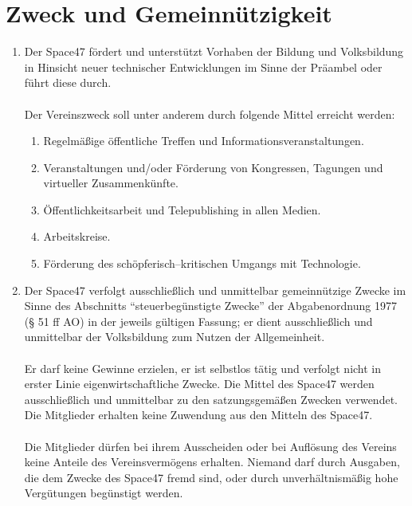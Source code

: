 \documentclass[a4paper]{article}
\begin{document}
\section{Zweck und Gemeinnützigkeit}
\begin{enumerate}
	\item Der Space47 fördert und unterstützt Vorhaben der Bildung und Volksbildung in Hinsicht neuer technischer Entwicklungen im Sinne der Präambel oder führt diese durch. \\ \\
	Der Vereinszweck soll unter anderem durch folgende Mittel erreicht werden:
	\begin{enumerate}[-]
		\item Regelmäßige öffentliche Treffen und Informationsveranstaltungen.
		\item Veranstaltungen und/oder Förderung von Kongressen, Tagungen und virtueller Zusammenkünfte.
		\item Öffentlichkeitsarbeit und Telepublishing in allen Medien.
		\item Arbeitskreise.
		\item Förderung des schöpferisch–kritischen Umgangs mit Technologie.
	\end{enumerate}

	\item Der Space47 verfolgt ausschließlich und unmittelbar gemeinnützige Zwecke im Sinne des Abschnitts \enquote{steuerbegünstigte Zwecke} der Abgabenordnung 1977 (§ 51 ff AO) in der jeweils gültigen Fassung; er dient ausschließlich und unmittelbar der Volksbildung zum Nutzen der Allgemeinheit. \\ \\
	Er darf keine Gewinne erzielen, er ist selbstlos tätig und verfolgt nicht in erster Linie eigenwirtschaftliche Zwecke. Die Mittel des Space47 werden ausschließlich und unmittelbar zu den satzungsgemäßen Zwecken verwendet. Die Mitglieder erhalten keine Zuwendung aus den Mitteln des Space47. \\ \\
	Die Mitglieder dürfen bei ihrem Ausscheiden oder bei Auflösung des Vereins keine Anteile des Vereinsvermögens erhalten. Niemand darf durch Ausgaben, die dem Zwecke des Space47 fremd sind, oder durch unverhältnismäßig hohe Vergütungen begünstigt werden.
\end{enumerate}
\end{document}
